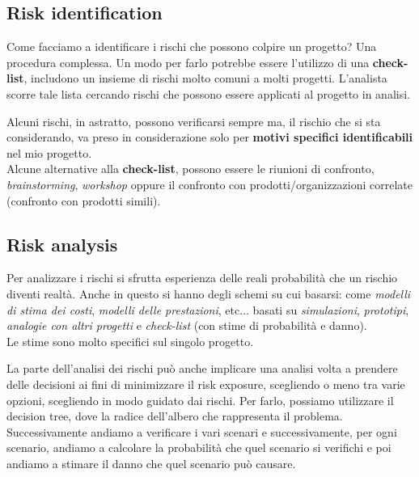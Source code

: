 \subsection{Risk identification}
Come facciamo a identificare i rischi che possono colpire un progetto? Una procedura complessa. 
Un modo per farlo potrebbe essere l'utilizzo di una \textbf{check-list}, includono un insieme di rischi molto comuni a molti progetti. L'analista scorre tale lista cercando rischi che possono essere applicati al progetto in analisi.

Alcuni rischi, in astratto, possono verificarsi sempre ma, il rischio che si sta considerando, va preso in considerazione solo per \textbf{ motivi specifici identificabili} nel mio progetto.\\
Alcune alternative alla \textbf{check-list}, possono essere le riunioni di confronto, \textit{brainstorming}, \textit{workshop} oppure il confronto con prodotti/organizzazioni correlate (confronto con prodotti simili). 

\subsection{Risk analysis}
Per analizzare i rischi si sfrutta esperienza delle reali probabilità che un rischio diventi realtà. Anche in questo si hanno degli schemi su cui basarsi: come \textit{modelli di stima dei costi}, \textit{modelli delle prestazioni}, etc$\ldots$ basati su \textit{simulazioni}, \textit{prototipi}, \textit{analogie con altri progetti} e \textit{check-list} (con stime di probabilità e danno).\\ Le stime sono molto specifici sul singolo progetto.

La parte dell'analisi dei rischi può anche implicare una analisi volta a prendere delle decisioni ai fini di minimizzare il risk exposure, scegliendo o meno tra varie opzioni, scegliendo in modo guidato dai rischi. Per farlo, possiamo utilizzare il decision tree, dove la radice dell'albero che rappresenta il problema. Successivamente andiamo a verificare i vari scenari e successivamente, per ogni scenario, andiamo a calcolare la probabilità che quel scenario si verifichi e poi andiamo a stimare il danno che quel scenario può causare. 


